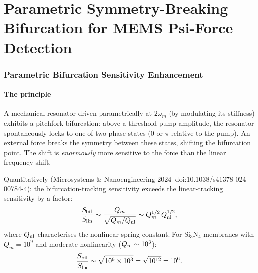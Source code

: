 \documentclass[11pt]{article}
\theoremstyle{definition}
\theoremstyle{remark}
\begin{document}
\part{Parametric Symmetry-Breaking Bifurcation for MEMS Psi-Force Detection}
\label{part:parametric}


\section{Parametric Bifurcation Sensitivity Enhancement}
\label{sec:parametric}

\subsection{The principle}

A mechanical resonator driven parametrically at $2\omega_m$ (by
modulating its stiffness) exhibits a pitchfork bifurcation: above
a threshold pump amplitude, the resonator spontaneously locks to one
of two phase states ($0$ or $\pi$ relative to the pump). An external
force breaks the symmetry between these states, shifting the bifurcation
point. The shift is \emph{enormously} more sensitive to the force than
the linear frequency shift.

Quantitatively (Microsystems \& Nanoengineering 2024,
doi:10.1038/s41378-024-00784-4): the bifurcation-tracking sensitivity
exceeds the linear-tracking sensitivity by a factor:
\begin{equation}
\frac{S_{\rm bif}}{S_{\rm lin}} \sim \frac{Q_m}{\sqrt{Q_m/Q_{\rm nl}}}
\sim Q_m^{1/2}\,Q_{\rm nl}^{1/2},
\label{eq:bifurcation_gain}
\end{equation}
where $Q_{\rm nl}$ characterises the nonlinear spring constant.
For Si$_3$N$_4$ membranes with $Q_m = 10^9$ and moderate nonlinearity
($Q_{\rm nl} \sim 10^3$):
\begin{equation}
\frac{S_{\rm bif}}{S_{\rm lin}} \sim \sqrt{10^9 \times 10^3}
= \sqrt{10^{12}} = 10^6.
\label{eq:bif_gain_numerical}
\end{equation}
\end{document}
